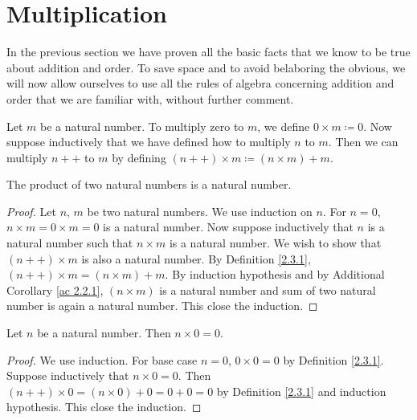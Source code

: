 \section{Multiplication}\label{sec 2.3}
\begin{note}
In the previous section we have proven all the basic facts that we know to be true about addition and order.
To save space and to avoid belaboring the obvious, we will now allow ourselves to use all the rules of algebra concerning addition and order that we are familiar with, without further comment.
\end{note}

\begin{definition}\label{2.3.1}
Let \(m\) be a natural number.
To multiply zero to \(m\), we define \(0 \times m \coloneqq 0\).
Now suppose inductively that we have defined how to multiply \(n\) to \(m\).
Then we can multiply \(n++\) to \(m\) by defining \((n++) \times m \coloneqq (n \times m) + m\).
\end{definition}

\begin{additional corollary}\label{ac 2.3.1}
The product of two natural numbers is a natural number.
\end{additional corollary}

\begin{proof}
Let \(n\), \(m\) be two natural numbers.
We use induction on \(n\).
For \(n = 0\), \(n \times m = 0 \times m = 0\) is a natural number.
Now suppose inductively that \(n\) is a natural number such that \(n \times m\) is a natural number.
We wish to show that \((n++) \times m\) is also a natural number.
By Definition \ref{2.3.1}, \((n++) \times m = (n \times m) + m\).
By induction hypothesis and by Additional Corollary \ref{ac 2.2.1}, \((n \times m)\) is a natural number and sum of two natural number is again a natural number.
This close the induction.
\end{proof}

\begin{additional corollary}\label{ac 2.3.2}
Let \(n\) be a natural number.
Then \(n \times 0 = 0\).
\end{additional corollary}

\begin{proof}
We use induction.
For base case \(n = 0\), \(0 \times 0 = 0\) by Definition \ref{2.3.1}.
Suppose inductively that \(n \times 0 = 0\).
Then \((n++) \times 0 = (n \times 0) + 0 = 0 + 0 = 0\) by Definition \ref{2.3.1} and induction hypothesis.
This close the induction.
\end{proof}

